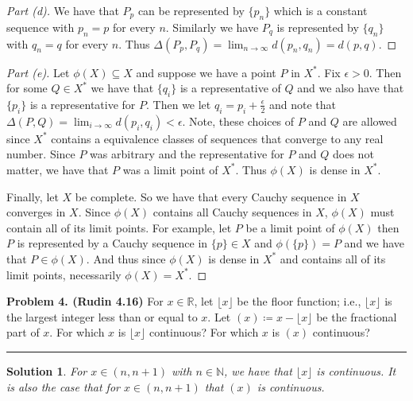 \documentclass[leqno]{article}
\theoremstyle{nonumberplain}
\newtheorem{proof}{Proof}
\newtheorem{solution}{Solution}
\begin{document}
\begin{proof}[Part (d)]
We have that $P_p$ can be represented by $\{p_n\}$ which is a constant sequence with $p_n=p$ for every $n$.  Similarly we have $P_q$ is represented by $\{q_n\}$ with $q_n=q$ for every $n$.  Thus $\Delta(P_p,P_q)=\lim_{n\to \infty}d(p_n,q_n)=d(p,q)$. 
\end{proof}

\begin{proof}[Part (e)]
Let $\phi(X)\subseteq X$ and suppose we have a point $P$ in $X^*$. Fix $\epsilon>0$. Then for some $Q\in X^*$ we have that $\{q_i\}$ is a representative of $Q$ and we also have that $\{p_i\}$ is a representative for $P$. Then we let $q_i=p_i+\frac{\epsilon}{2}$ and note that $\Delta(P,Q)=\lim_{i\to \infty}d(p_i,q_i)<\epsilon$.   Note, these choices of $P$ and $Q$ are allowed since $X^*$ contains a equivalence classes of sequences that converge to any real number.  Since $P$ was arbitrary and the representative for $P$ and $Q$ does not matter, we have that $P$ was a limit point of $X^*$.  Thus $\phi(X)$ is dense in $X^*$.

Finally, let $X$ be complete.  So we have that every Cauchy sequence in $X$ converges in $X$.  Since $\phi(X)$ contains all Cauchy sequences in $X$, $\phi(X)$ must contain all of its limit points.  For example, let $P$ be a limit point of $\phi(X)$ then $P$ is represented by a Cauchy sequence in $\{p\}\in X$ and $\phi(\{p\})=P$ and we have that $P\in \phi(X)$. And thus since $\phi(X)$ is dense in $X^*$ and contains all of its limit points, necessarily $\phi(X)=X^*$.
\end{proof}

\pagebreak





\noindent\textbf{Problem 4. (Rudin 4.16)} For $x\in \mathbb{R}$, let $\lfloor x \rfloor$ be the floor function; i.e., $\lfloor x \rfloor$ is the largest integer less than or equal to $x$. Let $(x)\coloneq x - \lfloor x \rfloor$ be the fractional part of $x$. For which $x$ is $\lfloor x \rfloor$ continuous? For which $x$ is $(x)$ continuous?

\noindent\rule[0.5ex]{\linewidth}{1pt}

\begin{solution} 
For $x\in(n,n+1)$ with $n\in \mathbb{N}$, we have that $\lfloor x  \rfloor$ is continuous.  It is also the case that for $x\in(n,n+1)$ that $(x)$ is continuous.
\end{solution}

\pagebreak
\end{document}
